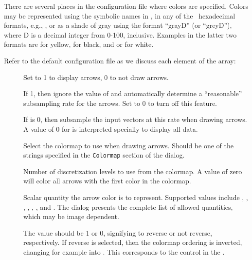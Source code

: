 There are several places in the configuration file where colors are
specified.  Colors may be represented using the symbolic names in
, in any of the \Tk\ hexadecimal
formats, e.g., , or as a shade of gray using the format
``grayD'' (or ``greyD''), where D is a decimal integer from 0-100,
inclusive.  Examples in the latter two formats are  for
yellow,  for black, and  or  for
white.

Refer to the default configuration file as we discuss each element of
the  array:
\begin{description}
\item[]
  Set to 1 to display arrows, 0 to not draw arrows.
\item[]
 If 1, then ignore the value of  and
 automatically determine a ``reasonable'' subsampling rate for the
 arrows.  Set to 0 to turn off this feature.
\item[]
 If  is 0, then subsample the input vectors at this
 rate when drawing arrows.  A value of 0 for  is
 interpreted specially to display all data.
\item[]
  Select the colormap to use when drawing arrows.  Should be one of the
  strings specified in the {\tt Colormap} section of the
   dialog.
\item[]
  Number of discretization levels to use
  from the colormap.  A value of zero will color all arrows with the
  first color in the colormap.
\item[]
 Scalar quantity the arrow color is to represent.
 Supported values include , , , ,
 , , and .  The
  dialog presents the complete list of
 allowed quantities, which may be image dependent.
\item[]
 The  value should be 1 or 0, signifying to reverse or
 not reverse, respectively.  If reverse is selected, then the colormap
 ordering is inverted, changing for example  into
 .  This corresponds to the  control in
 the .
\item[]

\end{description}
